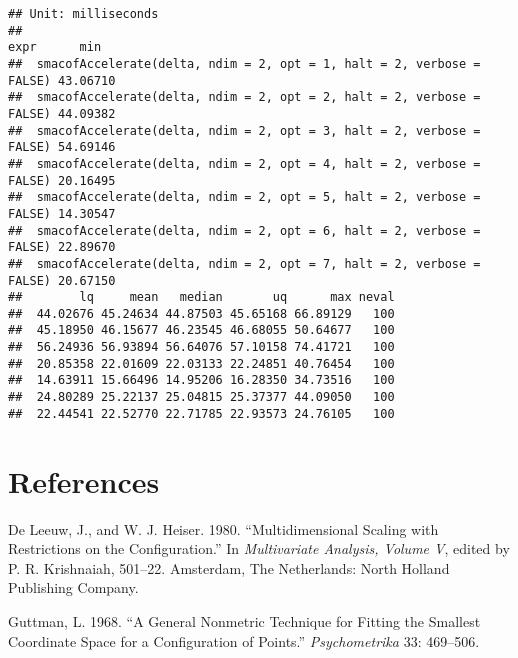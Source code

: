 \documentclass[
  12pt,
]{article}
\newlength{\cslhangindent}
\newenvironment{CSLReferences}[2] %
 {\begin{list}{}{%
  \setlength{\itemindent}{0pt}
  \setlength{\leftmargin}{0pt}
  \setlength{\parsep}{0pt}
  \ifodd #1
   \setlength{\leftmargin}{\cslhangindent}
   \setlength{\itemindent}{-1\cslhangindent}
  \fi
  \setlength{\itemsep}{#2\baselineskip}}}
 {\end{list}}
\begin{document}
\begin{verbatim}
## Unit: milliseconds
##                                                                   expr      min
##  smacofAccelerate(delta, ndim = 2, opt = 1, halt = 2, verbose = FALSE) 43.06710
##  smacofAccelerate(delta, ndim = 2, opt = 2, halt = 2, verbose = FALSE) 44.09382
##  smacofAccelerate(delta, ndim = 2, opt = 3, halt = 2, verbose = FALSE) 54.69146
##  smacofAccelerate(delta, ndim = 2, opt = 4, halt = 2, verbose = FALSE) 20.16495
##  smacofAccelerate(delta, ndim = 2, opt = 5, halt = 2, verbose = FALSE) 14.30547
##  smacofAccelerate(delta, ndim = 2, opt = 6, halt = 2, verbose = FALSE) 22.89670
##  smacofAccelerate(delta, ndim = 2, opt = 7, halt = 2, verbose = FALSE) 20.67150
##        lq     mean   median       uq      max neval
##  44.02676 45.24634 44.87503 45.65168 66.89129   100
##  45.18950 46.15677 46.23545 46.68055 50.64677   100
##  56.24936 56.93894 56.64076 57.10158 74.41721   100
##  20.85358 22.01609 22.03133 22.24851 40.76454   100
##  14.63911 15.66496 14.95206 16.28350 34.73516   100
##  24.80289 25.22137 25.04815 25.37377 44.09050   100
##  22.44541 22.52770 22.71785 22.93573 24.76105   100
\end{verbatim}

\section*{References}\label{references}

\label{refs}
\begin{CSLReferences}{1}{0}
De Leeuw, J., and W. J. Heiser. 1980. {``Multidimensional Scaling with Restrictions on the Configuration.''} In \emph{Multivariate Analysis, Volume {V}}, edited by P. R. Krishnaiah, 501--22. Amsterdam, The Netherlands: North Holland Publishing Company.

Guttman, L. 1968. {``{A General Nonmetric Technique for Fitting the Smallest Coordinate Space for a Configuration of Points}.''} \emph{Psychometrika} 33: 469--506.

\end{CSLReferences}
\end{document}
